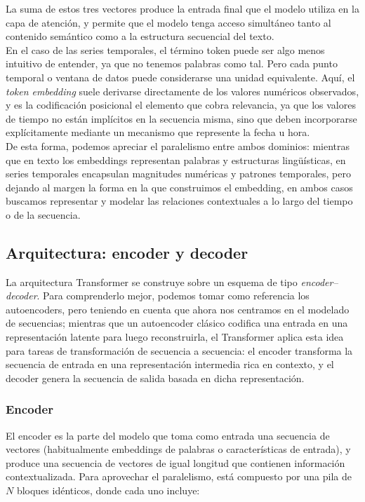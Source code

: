 La suma de estos tres vectores produce la entrada final que el modelo utiliza en la capa de atención, y permite que el modelo tenga acceso simultáneo tanto al contenido semántico como a la estructura secuencial del texto.\\

En el caso de las series temporales, el término token puede ser algo menos intuitivo de entender, ya que no tenemos palabras como tal. Pero cada punto temporal o ventana de datos puede considerarse una unidad equivalente. Aquí, el \textit{token embedding} suele derivarse directamente de los valores numéricos observados, y es la codificación posicional el elemento que cobra relevancia, ya que los valores de tiempo no están implícitos en la secuencia misma, sino que deben incorporarse explícitamente mediante un mecanismo que represente la fecha u hora.\\

De esta forma, podemos apreciar el paralelismo entre ambos dominios: mientras que en texto los embeddings representan palabras y estructuras lingüísticas, en series temporales encapsulan magnitudes numéricas y patrones temporales, pero dejando al margen la forma en la que construimos el embedding, en ambos casos buscamos representar y modelar las relaciones contextuales a lo largo del tiempo o de la secuencia.

\subsection{Arquitectura: encoder y decoder}

La arquitectura Transformer se construye sobre un esquema de tipo \textit{encoder–decoder}. Para comprenderlo mejor, podemos tomar como referencia los autoencoders, pero teniendo en cuenta que ahora nos centramos en el modelado de secuencias; mientras que un autoencoder clásico codifica una entrada en una representación latente para luego reconstruirla, el Transformer aplica esta idea para tareas de transformación de secuencia a secuencia: el encoder transforma la secuencia de entrada en una representación intermedia rica en contexto, y el decoder genera la secuencia de salida basada en dicha representación.

\subsubsection{Encoder}
El encoder es la parte del modelo que toma como entrada una secuencia de vectores (habitualmente embeddings de palabras o características de entrada), y produce una secuencia de vectores de igual longitud que contienen información contextualizada. Para aprovechar el paralelismo, está compuesto por una pila de $N$ bloques idénticos, donde cada uno incluye:

